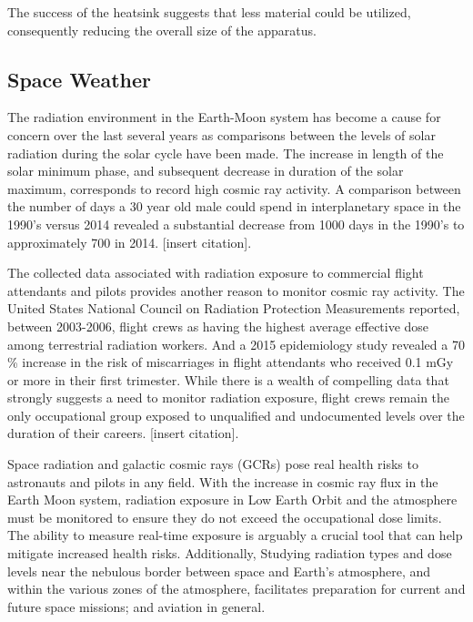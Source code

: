 The success of the heatsink suggests that less material could be utilized, consequently reducing the overall size of the apparatus.



\subsection{Space Weather}





The radiation environment in the Earth-Moon system has become a cause for concern over the last several years as comparisons between the levels of solar radiation during the solar cycle have been made. The increase in length of the solar minimum phase, and subsequent decrease in duration of the solar maximum, corresponds to record high cosmic ray activity.  A comparison between the number of days a 30 year old male could spend in interplanetary space in the 1990's versus 2014 revealed a substantial decrease from 1000 days in the 1990's to approximately 700 in 2014. [insert citation].

The collected data associated with radiation exposure to commercial flight attendants and pilots provides another reason to monitor cosmic ray activity.  The United States National Council on Radiation Protection Measurements reported, between 2003-2006, flight crews as having the highest average effective dose among terrestrial radiation workers.  And a 2015 epidemiology study revealed a 70 \% increase in the risk of miscarriages in flight attendants who received 0.1 mGy or more in their first trimester.  While there is a wealth of compelling data that strongly suggests a need to monitor radiation exposure, flight crews remain the only occupational group exposed to unqualified and undocumented levels over the duration of their careers. [insert citation].     

Space radiation and galactic cosmic rays (GCRs) pose real health risks to astronauts and  pilots in any field.  With the increase in cosmic ray flux in the Earth Moon system, radiation exposure in Low Earth Orbit and the atmosphere must be monitored to ensure they do not exceed the occupational dose limits.  The ability to measure real-time exposure is arguably a crucial tool that can help mitigate increased health risks.  Additionally, Studying radiation types and dose levels near the nebulous border between space and Earth's atmosphere, and within the various zones of the atmosphere, facilitates preparation for current and future space missions; and aviation in general. 

